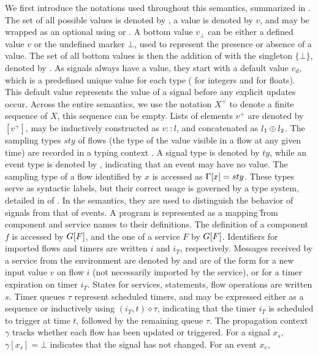 We first introduce the notations used throughout this semantics, summarized in
.
%
The set of all possible values is denoted by \Val, a value is denoted by $v$, and may be wrapped as
an optional using  or \none.
%
A bottom value $v_\bot$ can be either a defined value $v$ or the undefined marker $\bot$, used to
represent the presence or absence of a value. The set of all bottom values is then the addition of
\Val with the singleton $\{\bot\}$, denoted by \ValBot.
%
As signals always have a value, they start with a default value $v_d$, which is a predefined unique
value for each type (\eg {} for integers and  for floats). This default value
represents the value of a signal before any explicit updates occur.
%
Across the entire semantics, we use the notation $X^+$ to denote a finite sequence of $X$, this sequence can be empty.
Lists of elements $v^+$ are denoted by $[v^+]$, may be inductively constructed as $v::l$, and
concatenated as $l_1 \oplus l_2$.
%
The sampling types $sty$ of flows (\ie the type of the value visible in a flow at any given time)
are recorded in a typing context \tyCtx. A signal type is denoted by $ty$, while an event type is
denoted by , indicating that an event may have no value. The sampling type of a flow
identified by $x$ is accessed as $\Gamma[x] = sty$. These types serve as syntactic labels, but their
correct usage is governed by a type system, detailed in  of .
In the semantics, they are used to distinguish the behavior of signals from that of events.
%
A program is represented as a mapping \G from component and service names to their definitions.
The definition of a component $f$ is accessed by $G[F]$, and the one of a service $F$ by $G[F]$.
%
Identifiers for imported flows and timers are written $i$ and $i_T$, respectively.
%
Messages received by a service from the environment are denoted by \mess and are of the form
 for a new input value $v$ on flow $i$ (not necessarily imported by the service), or
 for a timer expiration on timer $i_T$.
%
States for services, statements, flow operations are written $s$.
%
Timer queues $\tau$ represent scheduled timers, and may be expressed either as a sequence
 or inductively using $(i_T, t) \diamond \tau$, indicating that the timer
$i_T$ is scheduled to trigger at time $t$, followed by the remaining queue $\tau$.
%
The propagation context $\gamma$ tracks whether each flow has been updated or triggered. For a
signal $x_s$, $\gamma[x_s] = \bot$ indicates that the signal has not changed. For an event $x_e$,
